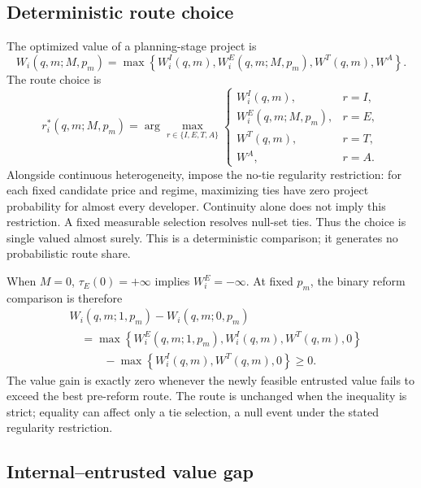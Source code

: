 \subsection{Deterministic route choice}
\label{subsec:p04-deterministic-choice}

The optimized value of a planning-stage project is
\begin{equation}
  W_i(q,m;M,p_m)
  =
  \max\left\{
    W_i^I(q,m),
    W_i^E(q,m;M,p_m),
    W^T(q,m),
    W^A
  \right\}.
  \label{eq:p04-optimized-value}
\end{equation}
The route choice is
\begin{equation}
  r_i^*(q,m;M,p_m)
  =
  \arg\max_{r\in\{I,E,T,A\}}
  \begin{cases}
    W_i^I(q,m), & r=I,\\
    W_i^E(q,m;M,p_m), & r=E,\\
    W^T(q,m), & r=T,\\
    W^A, & r=A.
  \end{cases}
  \label{eq:p04-route-choice}
\end{equation}
Alongside continuous heterogeneity, impose the no-tie regularity restriction:
for each fixed candidate price and regime, maximizing ties have zero project
probability for almost every developer. Continuity alone does not imply this
restriction. A fixed measurable selection resolves null-set ties. Thus the
choice is single valued almost surely. This is a
deterministic comparison; it generates no probabilistic route share.

When \(M=0\), \(\tau_E(0)=+\infty\) implies \(W_i^E=-\infty\).
At fixed \(p_m\), the binary reform comparison is therefore
\begin{equation}
  \begin{aligned}
  &W_i(q,m;1,p_m)-W_i(q,m;0,p_m)\\
  &\quad=
  \max\!\left\{
    W_i^E(q,m;1,p_m),W_i^I(q,m),W^T(q,m),0
  \right\}\\
  &\qquad\quad-\max\!\left\{W_i^I(q,m),W^T(q,m),0\right\}
  \geq0.
  \end{aligned}
  \label{eq:p04-binary-value-effect}
\end{equation}
The value gain is exactly zero whenever the newly feasible entrusted value
fails to exceed the best pre-reform route. The route is unchanged when the
inequality is strict; equality can affect only a tie selection, a null event
under the stated regularity restriction.

\subsection{Internal--entrusted value gap}
\label{subsec:p04-value-gap}

